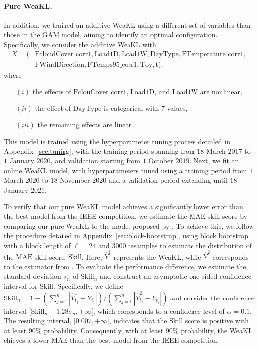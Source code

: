\paragraph{Pure WeaKL.}
In addition, we trained an additive WeaKL using a different set of variables than those in the GAM model, aiming to identify an optimal configuration. Specifically, we consider the additive WeaKL with 
\begin{align*}
    X= (&\mathrm{FcloudCover\_corr1},\mathrm{Load1D},\mathrm{Load1W},\mathrm{DayType},\mathrm{FTemperature\_corr1},\\  &\mathrm{FWindDirection}, \mathrm{FTemps95\_corr1},\mathrm{Toy},\mathrm{t}),
\end{align*} where 
\begin{itemize}
    \item[$(i)$] the effects of $\mathrm{FclouCover\_corr1}$, $\mathrm{Load1D}$, and $\mathrm{Load1W}$ are nonlinear,
    \item[$(ii)$] the effect of $\mathrm{DayType}$ is categorical with 7 values,
    \item[$(iii)$] the remaining effects are linear.
\end{itemize}
This model is trained using the hyperparameter tuning process detailed in Appendix~\ref{sec:tuning}, with the training period spanning from $18$ March $2017$ to $1$ January $2020$, and validation starting from $1$ October $2019$.
Next, we fit an online WeaKL model, with hyperparameters tuned using a training period from $1$ March $2020$ to $18$ November $2020$ and a validation period extending until $18$ January $2021$.

To verify that our pure WeaKL model achieves a significantly lower error than the best model from the IEEE competition, we estimate the $\mathrm{MAE}$ skill score by comparing our pure WeaKL to the model proposed by \citet{vilmarest2022state}. To achieve this, we follow the procedure detailed in Appendix~\ref{sec:block-bootstrap}, using block bootstrap with a block length of $\ell = 24$ and $3000$ resamples to estimate the distribution of the $\mathrm{MAE}$ skill score, $\mathrm{Skill}$. Here, $\hat{Y}^1$ represents the WeaKL, while $\hat{Y}^2$ corresponds to the estimator from \citet{vilmarest2022state}. To evaluate the performance difference, we estimate the standard deviation $\sigma_n$ of $\mathrm{Skill}_n$ and construct an asymptotic one-sided confidence interval for $\mathrm{Skill}$. Specifically, we define
$\mathrm{Skill}_n = 1 - (\sum_{j=1}^n |\hat Y^1_{t_j} - Y_{t_j}| )/(\sum_{j=1}^n |\hat Y^2_{t_j} - Y_{t_j}|)$
and consider the confidence interval $[\mathrm{Skill}_n - 1.28 \sigma_n, +\infty[$, which corresponds to a confidence level of $\alpha = 0.1$. The resulting interval, $[0.007, +\infty[$, indicates that the $\mathrm{Skill}$ score is positive with at least $90\%$ probability. Consequently, with at least $90\%$ probability, the WeaKL  chieves a lower $\mathrm{MAE}$ than the best model from the IEEE competition.

